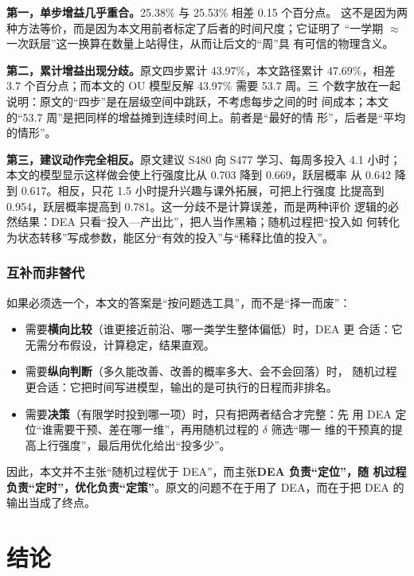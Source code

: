 \textbf{第一，单步增益几乎重合。}25.38\% 与 25.53\% 相差 0.15 个百分点。
这不是因为两种方法等价，而是因为本文用前者标定了后者的时间尺度；它证明了
“一学期 $\approx$ 一次跃层”这一换算在数量上站得住，从而让后文的“周”具
有可信的物理含义。

\textbf{第二，累计增益出现分歧。}原文四步累计 43.97\%，本文路径累计
47.69\%，相差 3.7 个百分点；而本文的 OU 模型反解 43.97\% 需要 53.7 周。三
个数字放在一起说明：原文的“四步”是在层级空间中跳跃，不考虑每步之间的时
间成本；本文的“53.7 周”是把同样的增益摊到连续时间上。前者是“最好的情
形”，后者是“平均的情形”。

\textbf{第三，建议动作完全相反。}原文建议 S480 向 S477 学习、每周多投入
4.1 小时；本文的模型显示这样做会使上行强度比从 0.703 降到 0.669，跃层概率
从 0.642 降到 0.617。相反，只花 1.5 小时提升兴趣与课外拓展，可把上行强度
比提高到 0.954，跃层概率提高到 0.781。这一分歧不是计算误差，而是两种评价
逻辑的必然结果：DEA 只看“投入—产出比”，把人当作黑箱；随机过程把“投入如
何转化为状态转移”写成参数，能区分“有效的投入”与“稀释比值的投入”。

\subsubsection{互补而非替代}

如果必须选一个，本文的答案是“按问题选工具”，而不是“择一而废”：

\begin{itemize}[leftmargin=2em,itemsep=2pt,topsep=2pt]
\item 需要\textbf{横向比较}（谁更接近前沿、哪一类学生整体偏低）时，DEA 更
  合适：它无需分布假设，计算稳定，结果直观。
\item 需要\textbf{纵向判断}（多久能改善、改善的概率多大、会不会回落）时，
  随机过程更合适：它把时间写进模型，输出的是可执行的日程而非排名。
\item 需要\textbf{决策}（有限学时投到哪一项）时，只有把两者结合才完整：先
  用 DEA 定位“谁需要干预、差在哪一维”，再用随机过程的 $\delta$ 筛选“哪一
  维的干预真的提高上行强度”，最后用优化给出“投多少”。
\end{itemize}

因此，本文并不主张“随机过程优于 DEA”，而主张\textbf{DEA 负责“定位”，随
机过程负责“定时”，优化负责“定策”}。原文的问题不在于用了 DEA，而在于把
DEA 的输出当成了终点。

\section{结论}

